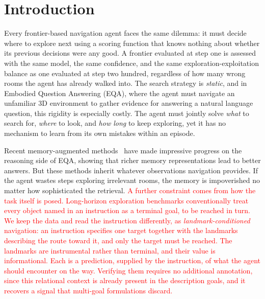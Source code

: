 \section{Introduction}

Every frontier-based navigation agent faces the same dilemma: it must decide where to explore next using a scoring function that knows nothing about whether its previous decisions were any good. A frontier evaluated at step one is assessed with the same model, the same confidence, and the same exploration-exploitation balance as one evaluated at step two hundred, regardless of how many wrong rooms the agent has already walked into. The search strategy is \emph{static}, and in Embodied Question Answering (EQA), where the agent must navigate an unfamiliar 3D environment to gather evidence for answering a natural language question, this rigidity is especially costly. The agent must jointly solve \emph{what} to search for, \emph{where} to look, and \emph{how long} to keep exploring, yet it has no mechanism to learn from its own mistakes within an episode.

Recent memory-augmented methods~\cite{huang20243dmem,yang2024ramem,wang2026memoryexplorer} have made impressive progress on the reasoning side of EQA, showing that richer memory representations lead to better answers. But these methods inherit whatever observations navigation provides. If the agent wastes steps exploring irrelevant rooms, the memory is impoverished no matter how sophisticated the retrieval. \textcolor{red}{A further constraint comes from how the task itself is posed. Long-horizon exploration benchmarks conventionally treat every object named in an instruction as a terminal goal, to be reached in turn. We keep the data and read the instruction differently, as \emph{landmark-conditioned} navigation: an instruction specifies one target together with the landmarks describing the route toward it, and only the target must be reached. The landmarks are instrumental rather than terminal, and their value is informational. Each is a prediction, supplied by the instruction, of what the agent should encounter on the way. Verifying them requires no additional annotation, since this relational context is already present in the description goals, and it recovers a signal that multi-goal formulations discard.}

